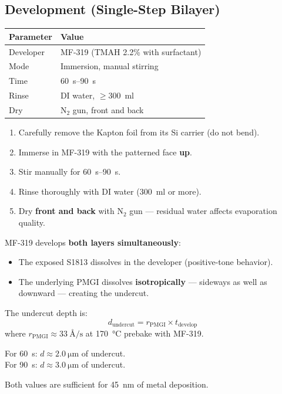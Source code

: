 \documentclass[11pt,a4paper]{article}
\begin{document}
\subsection{Development (Single-Step Bilayer)}

\begin{parambox}
\begin{tabular}{@{}ll@{}}
\toprule
\textbf{Parameter} & \textbf{Value} \\
\midrule
Developer & MF-319 (TMAH 2.2\% with surfactant) \\
Mode & Immersion, manual stirring \\
Time & \SIrange{60}{90}{\second} \\
Rinse & DI water, $\geq$\SI{300}{\ml} \\
Dry & N$_2$ gun, front and back \\
\bottomrule
\end{tabular}
\end{parambox}

\begin{enumerate}[label=\alph*)]
    \item Carefully remove the Kapton foil from its Si carrier
          (do not bend).
    \item Immerse in MF-319 with the patterned face \textbf{up}.
    \item Stir manually for \SIrange{60}{90}{\second}.
    \item Rinse thoroughly with DI water (\SI{300}{\ml} or more).
    \item Dry \textbf{front and back} with N$_2$ gun --- residual water
          affects evaporation quality.
\end{enumerate}

\begin{tipbox}
MF-319 develops \textbf{both layers simultaneously}:
\begin{itemize}
    \item The exposed S1813 dissolves in the developer (positive-tone
          behavior).
    \item The underlying PMGI dissolves \textbf{isotropically} ---
          sideways as well as downward --- creating the undercut.
\end{itemize}

The undercut depth is:
\begin{equation*}
    d_{\text{undercut}} = r_{\text{PMGI}} \times t_{\text{develop}}
\end{equation*}
where $r_{\text{PMGI}} \approx \SI{33}{\angstrom\per\s}$ at
\SI{170}{\celsius} prebake with MF-319.

For \SI{60}{\s}: $d \approx \SI{2.0}{\micro\m}$ of undercut. \\
For \SI{90}{\s}: $d \approx \SI{3.0}{\micro\m}$ of undercut.

Both values are sufficient for \SI{45}{\nm} of metal deposition.
\end{tipbox}
\end{document}
